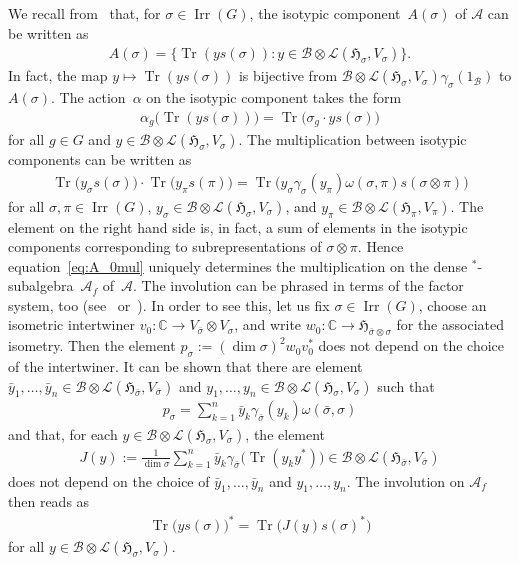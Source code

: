 \documentclass[pdftex]{sigma}
\numberwithin{equation}{section}
\newcommand*{\C}{\mathbb C}		%
\newcommand*{\tensor}{\otimes}		%
\DeclareMathOperator{\Tr}{Tr}		%
\newcommand*{\Star}{$^*$\nobreakdash}
\newcommand*{\hilb}{\mathfrak}		%
\newcommand*{\alg}{\mathcal}		%
\newcommand*{\hH}{\hilb{H}}			%
\newcommand*{\one}{1}				%
\newcommand*{\aA}{\alg{A}}			%
\newcommand*{\aB}{\alg{B}} 			%
\newcommand*{\End}{\mathcal{L}} %
\DeclareMathOperator{\Irrep}{Irr} 			%
\begin{document}
We recall from~\cite{SchWa17c} that, for $\sigma \in \Irrep(G)$, the isotypic component~$A(\sigma)$ of $\aA$ can be written as
\begin{gather*}
	A(\sigma) = \bigl\{ \Tr ( y s(\sigma) )\colon y \in \aB \tensor \End(\hH_\sigma, V_\sigma) \bigr\}.
\end{gather*}
In fact, the map $y \mapsto \Tr ( y s(\sigma) )$ is bijective from $\aB \tensor \End(\hH_\sigma, V_\sigma) \gamma_\sigma(\one_\aB)$ to $A(\sigma)$.
The action~$\alpha$ on the isotypic component takes the form
\begin{gather}
	\alpha_g \bigl( \Tr ( ys(\sigma) ) \bigr) = \Tr\bigl( \sigma_g \cdot ys(\sigma) \bigr)\label{eq:A_0action}
\end{gather}
for all $g \in G$ and $y \in \aB \tensor \End(\hH_\sigma,V_\sigma)$.
The multiplication between isotypic components can be written as
	\begin{gather}
		\Tr \bigl( y_\sigma s(\sigma) \bigr) \cdot \Tr \bigl( y_\pi s(\pi) \bigr)
		=
		\Tr \bigl( y_\sigma \gamma_\sigma(y_\pi) \omega(\sigma, \pi) s(\sigma \tensor \pi) \bigr)\label{eq:A_0mul}
	\end{gather}
	for all $\sigma, \pi \in \Irrep(G)$, $y_\sigma \in \aB \tensor \End(\hH_\sigma, V_\sigma)$, and $y_\pi \in \aB \tensor \End(\hH_\pi, V_\pi)$.
The element on the right hand side is, in fact, a sum of elements in the isotypic components corresponding to subrepresentations of $\sigma \tensor \pi$.
Hence equation~\eqref{eq:A_0mul} uniquely determines the multiplication on the dense \Star-subalgebra~$\aA_f$ of~$\aA$.
The involution can be phrased in terms of the factor system, too (see~\cite[Section~5]{SchWa17c} or~\cite[Lemma~2.4]{Ne13}).
In order to see this, let us fix $\sigma \in \Irrep(G)$, choose an isometric intertwiner $v_0\colon \C \to V_{\bar\sigma} \tensor V_\sigma$, and write $w_0\colon \C \to \hH_{\bar\sigma \tensor \sigma}$ for the associated isometry.
Then the element $p_\sigma := (\dim \sigma)^2 w_0^{}v_0^*$ does not depend on the choice of the intertwiner.
It can be shown that there are element $\bar y_1, \dots, \bar y_n \in \aB \tensor \End(\hH_{\bar\sigma}, V_{\bar\sigma})$ and $y_1, \dots, y_n \in \aB \tensor \End(\hH_\sigma, V_\sigma)$ such that
\begin{gather}
	\label{eq:involution_decomposition}
	p_\sigma = \sum_{k=1}^n \bar y_k \gamma_{\bar\sigma}(y_k) \omega(\bar \sigma, \sigma)
\end{gather}
and that, for each $y \in \aB \tensor \End(\hH_\sigma, V_\sigma)$, the element
\begin{gather*}
	J(y) := \frac{1}{\dim \sigma}\sum_{k=1}^n \bar y_k \gamma_{\bar\sigma} \bigl( \Tr(y_k y^*) \bigr) \in \aB \tensor \End(\hH_{\bar\sigma}, V_{\bar \sigma})
\end{gather*}
does not depend on the choice of $\bar y_1, \dots, \bar y_n$ and $y_1, \dots, y_n$.
The involution on $\aA_f$ then reads as
\begin{gather*}
	\Tr \bigl( y s(\sigma) \bigr)^* = \Tr \bigl( J(y) s(\sigma)^* \bigr)
\end{gather*}
for all $y \in \aB \tensor \End(\hH_\sigma, V_\sigma)$.
\end{document}
